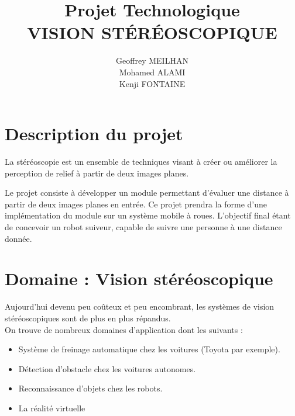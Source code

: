 \documentclass[a4paper]{article}
\title
{
	\LARGE{Projet Technologique}
	\HRule \\ [0.5cm]
	\LARGE \textbf{\uppercase{Vision Stéréoscopique}}
	\HRule \\ [0.5cm]
}
\author{Geoffrey MEILHAN \\ Mohamed ALAMI \\ Kenji FONTAINE}
\begin{document}
\null  %
\nointerlineskip  %
\vfill
\let\snewpage \newpage
\let\newpage \relax
\maketitle
\let \newpage \snewpage
\vfill
\break %


\tableofcontents
\newpage


\section{Description du projet}
La stéréoscopie est un ensemble de techniques visant à créer ou améliorer la
perception de relief à partir de deux images planes.

Le projet consiste à développer un module permettant d'évaluer une distance à
partir de deux images planes en entrée. Ce projet prendra la forme d'une implémentation
du module sur un système mobile à roues. L'objectif final étant de concevoir un robot
suiveur, capable de suivre une personne à une distance donnée.


\section{Domaine : Vision stéréoscopique}

Aujourd'hui devenu peu coûteux et peu encombrant, les systèmes de vision
stéréoscopiques sont de plus en plus répandus. \\
On trouve de nombreux domaines d'application dont les suivants :
\begin{itemize}
	\item Système de freinage automatique chez les voitures (Toyota par exemple).
	\item Détection d'obstacle chez les voitures autonomes.
	\item Reconnaissance d'objets chez les robots.
	\item La réalité virtuelle
\end{itemize}
\end{document}
